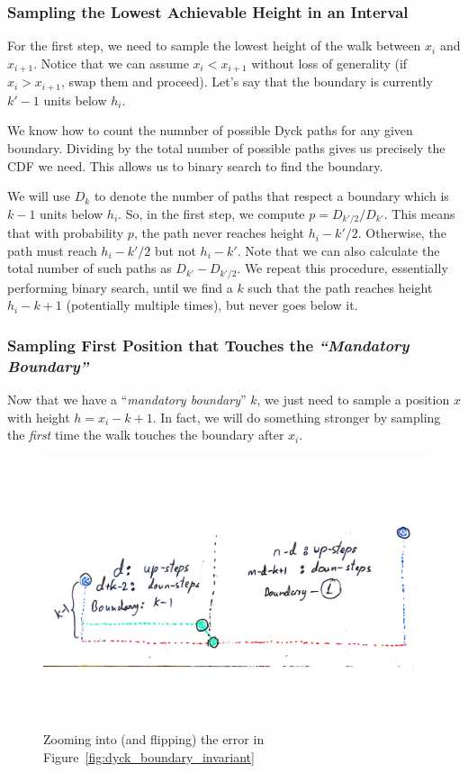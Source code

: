 \subsubsection{Sampling the Lowest Achievable Height in an Interval}%
\label{ssub:sampling_the_lowest_achievable_height}
For the first step, we need to sample the lowest height of the walk between $x_i$ and $x_{i+1}$.
Notice that we can assume $x_i < x_{i+1}$ without loss of generality (if $x_i > x_{i+1}$, swap them and proceed).
Let's say that the boundary is currently $k'-1$ units below $h_i$.

We know how to count the numnber of possible Dyck paths for any given boundary.
Dividing by the total number of possible paths gives us precisely the CDF we need.
This allows us to binary search to find the boundary.

We will use $D_{k}$ to denote the number of paths that respect a boundary which is $k-1$ units below $h_i$.
So, in the first step, we compute $p = D_{k'/2}/D_{k'}$.
This means that with probability $p$, the path never reaches height $h_i - k'/2$.
Otherwise, the path must reach $h_i-k'/2$ but not $h_i-k'$.
Note that we can also calculate the total number of such paths as $D_{k'} - D_{k'/2}$.
We repeat this procedure, essentially performing binary search,
until we find a $k$ such that the path reaches height $h_i-k+1$ (potentially multiple times), but never goes below it.



\subsubsection{Sampling First Position that Touches the \emph{``Mandatory Boundary''}}%
\label{sec:sampling_first_position_touching_mandatory_boundary}

Now that we have a ``\emph{mandatory boundary}'' $k$, we just need to sample a position $x$ with height $h = x_i-k+1$.
In fact, we will do something stronger by sampling the \emph{first} time the walk touches the boundary after $x_i$.
\begin{figure}[htpb]
    \centering
    \includegraphics[width=1.0\linewidth, trim={0 6cm 0 5cm}]{images/dyck_return_sampling.pdf}
    \caption{Zooming into (and flipping) the error in Figure~\ref{fig:dyck_boundary_invariant}}
    \label{fig:dyck_return_sampling}
\end{figure}

